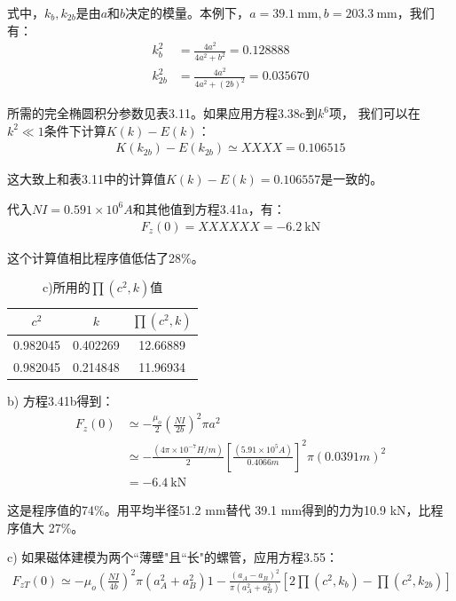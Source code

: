 式中，$k_b,k_{2b}$是由$a$和$b$决定的模量。本例下，$a=39.1 \ \mathrm{mm},b=203.3\ \mathrm{mm}$，我们有：
\begin{align*}
k_b^2&=\frac{4a^2}{4a^2+b^2}=0.128888\\
k_{2b}^2&=\frac{4a^2}{4a^2+(2b)^2}=0.035670
\end{align*}

所需的完全椭圆积分参数见表3.11。如果应用方程3.38c到$k^6$项，
我们可以在$k^2\ll 1$条件下计算$ K(k)−E(k)$：
\begin{align*}
K(k_{2b})-E(k_{2b})\simeq XXXX=0.106515
\end{align*}

这大致上和表3.11中的计算值$K(k)−E(k)=0.106557$是一致的。

代入$NI =0.591\times 10^6 A$和其他值到方程3.41a，有：
\begin{align*}
F_z(0)=XXXXXX=-6.2\ \mathrm{kN}
\end{align*}

这个计算值相比程序值低估了28\%。

\begin{table}[htbp]\small
\centering
\caption{c)所用的$\prod(c^2,k)$值}
	\begin{tabular}{|c|c|c|}
		\hline
		$c^2$      &$ k$        &$ \prod(c^2,k)$        \\ \hline
		0.982045 & 0.402269 & 12.66889 \\ \hline
		0.982045 & 0.214848 & 11.96934 \\ \hline
	\end{tabular}
\end{table}

b) 方程3.41b得到：
\begin{align*}
F_{z}(0)&\simeq-\frac{\mu_{o}}{2}(\frac{NI}{2b})^{2}\pi a^{2}\\%
&\simeq-\frac{(4\pi\times 10^{-7}H/m)}{2}[\frac{(5.91\times 10^{5}A)}{0.4066m}]^{2}\pi(0.0391m)^{2}\\
&=-6.4 \ \mathrm{kN}\tag{3.41b}
\end{align*}

这是程序值的74\%。用平均半径51.2 mm替代 39.1 mm得到的力为10.9 kN，比程序值大 27\%。 

c) 如果磁体建模为两个``薄壁"且``长"的螺管，应用方程3.55：
\begin{align*}
F_{zT}(0)\simeq-\mu_{o}(\frac{NI}{4b})^{2}\pi(a_{A}^{2}+a_{B}^{2}){1-\frac{(a_{A}-a_{B})^{2}}{\pi(a_{A}^{2}+a_{B}^{2})}[2\prod(c^{2},k_{b})-\prod(c^{2},k_{2b})]}\tag{3.55}%
\end{align*}

